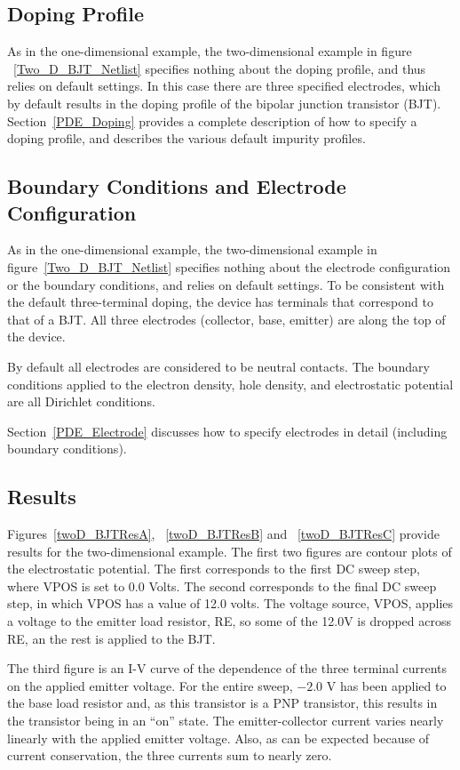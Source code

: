 \subsection{Doping Profile}
As in the one-dimensional example, the two-dimensional example in figure
~\ref{Two_D_BJT_Netlist} specifies nothing about the doping profile, and thus 
relies on default settings.  In this case there are three specified electrodes, 
which by default results in the doping profile of the bipolar junction transistor (BJT).  
Section~\ref{PDE_Doping} provides a complete description of how to specify a 
doping profile, and describes the various default impurity profiles.

\subsection{Boundary Conditions and Electrode Configuration}
As in the one-dimensional example, the two-dimensional example in
figure~\ref{Two_D_BJT_Netlist} specifies nothing about
the electrode configuration or the boundary conditions, and relies on
default settings.  To be consistent with the default three-terminal doping,
the device has terminals that correspond to that of a BJT.  All three
electrodes (collector, base, emitter) are along the top of the device.

By default all electrodes are considered to be neutral contacts.  The 
boundary conditions applied to the electron density, hole density, and 
electrostatic potential are all Dirichlet conditions.

Section~\ref{PDE_Electrode} discusses how to specify electrodes in detail 
(including boundary conditions).

\subsection{Results}
Figures~\ref{twoD_BJTResA}, ~\ref{twoD_BJTResB} and ~\ref{twoD_BJTResC} provide 
results for the two-dimensional example.  The first two figures are contour plots 
of the electrostatic potential.  The first corresponds to the first DC sweep step, 
where VPOS is set to 0.0 Volts.  The second corresponds to the final DC sweep 
step, in which VPOS has a value of 12.0 volts.  The voltage source, VPOS, 
applies a voltage to the emitter load resistor, RE, so some of the 12.0V is 
dropped across RE, an the rest is applied to the BJT.

The third figure is an I-V curve of the dependence of the three terminal currents 
on the applied emitter voltage.  For the entire sweep, $-2.0$ V has been applied to 
the base load resistor and, as this transistor is a PNP transistor, this results 
in the transistor being in an ``on'' state.  The emitter-collector current varies 
nearly linearly with the applied emitter voltage. Also, as can be expected 
because of current conservation, the three currents sum to nearly zero.

